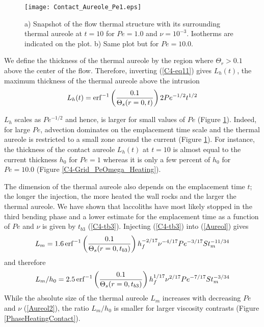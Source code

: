 \begin{figure}[h!]
  \begin{center}
    \graphicspath{ {/Users/thorey/Documents/These/Projet/Refroidissement/Skin_Model/Figure/Figure_Heating/} }
    \texttt{[image: Contact\_Aureole\_Pe1.eps]}
    \caption{a)  Snapshot  of  the  flow thermal  structure  with  its
      surrounding  thermal   aureole  at   $t=10$  for   $Pe=1.0$  and
      $\nu=10^{-3}$.  Isotherms  are indicated  on the plot.   b) Same
      plot but for $Pe=10.0$.}
    \label{Contact_Areuol2}
  \end{center}
\end{figure}

We define  the thickness of  the thermal  aureole by the  region where
$\Theta_r>0.1$  above the  center of  the flow.   Therefore, inverting
(\ref{C4-eq11}) gives  $L_h(t)$, the maximum thickness  of the thermal
aureole above the intrusion
\begin{equation}
  L_h(t)                                                           =
  \operatorname{erf}^{-1}\left(\frac{0.1}{\Theta_s(r=0,t)}\right)2Pe^{-1/2}t^{1/2}
  \label{Aureol}
\end{equation}

$L_h$ scales as  $Pe^{-1/2}$ and hence, is larger for  small values of
$Pe$ (Figure \ref{Contact_Areuol2}). Indeed, for large $Pe$, advection
dominates on  the emplacement  time scale and  the thermal  aureole is
restricted   to   a   small    zone   around   the   current   (Figure
\ref{Contact_Areuol2}).  For  instance, the  thickness of  the contact
aureole $L_h(t)$  at $t=10$ is  almost equal to the  current thickness
$h_0$  for $Pe=1$  whereas  it is  only  a few  percent  of $h_0$  for
$Pe=10.0$ (Figure \ref{C4-Grid_PeOmega_Heating}).

The dimension of  the thermal aureole also depends  on the emplacement
time $t$; the longer the injection, the more heated the wall rocks and
the larger  the thermal  aureole. We have  shown that  laccoliths have
most likely  stopped in the third  bending phase and a  lower estimate
for the emplacement time  as a function of $Pe$ and  $\nu$ is given by
$t_{b3}$ (\ref{C4-tb3}).  Injecting (\ref{C4-tb3}) into (\ref{Aureol})
gives
\begin{equation}
  L_m                                                           =1.6
  \operatorname{erf}^{-1}\left(\frac{0.1}{\Theta_s(r=0,t_{b3})}\right)h_f^{-2/17}\nu^{-4/17}Pe^{-3/17}St_m^{-11/34}
  \label{Aureol2}
\end{equation}
and therefore
\begin{equation}
  L_m/h_0                                                           =2.5
  \operatorname{erf}^{-1}\left(\frac{0.1}{\Theta_s(r=0,t_{b3})}\right)h_f^{1/17}\nu^{2/17}Pe^{-7/17}St_m^{-3/34}
  \label{Aureol3}
\end{equation}
While the  absolute size of  the thermal aureole $L_m$  increases with
decreasing  $Pe$ and  $\nu$  (\ref{Aureol2}), the  ratio $L_m/h_0$  is
smaller      for      larger     viscosity      contrasts      (Figure
\ref{PhaseHeatingContact}).


